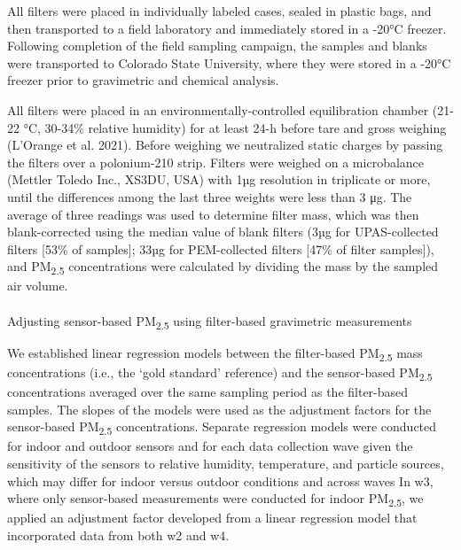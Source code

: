 \documentclass[
  letterpaper,
  DIV=11,
  numbers=noendperiod]{scrartcl}
\makeatletter
\let\oldparagraph\paragraph
\renewcommand{\paragraph}{
    \@ifstar
      \xxxParagraphStar
      \xxxParagraphNoStar
  }
\newcommand{\xxxParagraphStar}[1]{\oldparagraph*{#1}\mbox{}}
\newcommand{\xxxParagraphNoStar}[1]{\oldparagraph{#1}\mbox{}}
\makeatother
\begin{document}
All filters were placed in individually labeled cases, sealed in plastic
bags, and then transported to a field laboratory and immediately stored
in a -20°C freezer. Following completion of the field sampling campaign,
the samples and blanks were transported to Colorado State University,
where they were stored in a -20°C freezer prior to gravimetric and
chemical analysis.

All filters were placed in an environmentally-controlled equilibration
chamber (21-22 °C, 30-34\% relative humidity) for at least 24-h before
tare and gross weighing (L'Orange et al. 2021). Before weighing we
neutralized static charges by passing the filters over a polonium-210
strip. Filters were weighed on a microbalance (Mettler Toledo Inc.,
XS3DU, USA) with 1µg resolution in triplicate or more, until the
differences among the last three weights were less than 3 μg. The
average of three readings was used to determine filter mass, which was
then blank-corrected using the median value of blank filters (3µg for
UPAS-collected filters {[}53\% of samples{]}; 33µg for PEM-collected
filters {[}47\% of filter samples{]}), and PM\textsubscript{2.5}
concentrations were calculated by dividing the mass by the sampled air
volume.

\paragraph{\texorpdfstring{Adjusting sensor-based PM\textsubscript{2.5}
using filter-based gravimetric
measurements}{Adjusting sensor-based PM2.5 using filter-based gravimetric measurements}}\label{adjusting-sensor-based-pm2.5-using-filter-based-gravimetric-measurements}

We established linear regression models between the filter-based
PM\textsubscript{2.5} mass concentrations (i.e., the `gold standard'
reference) and the sensor-based PM\textsubscript{2.5} concentrations
averaged over the same sampling period as the filter-based samples. The
slopes of the models were used as the adjustment factors for the
sensor-based PM\textsubscript{2.5} concentrations. Separate regression
models were conducted for indoor and outdoor sensors and for each data
collection wave given the sensitivity of the sensors to relative
humidity, temperature, and particle sources, which may differ for indoor
versus outdoor conditions and across waves In w3, where only
sensor-based measurements were conducted for indoor
PM\textsubscript{2.5}, we applied an adjustment factor developed from a
linear regression model that incorporated data from both w2 and w4.
\end{document}
